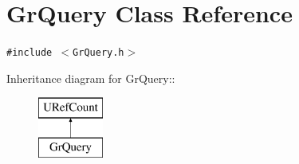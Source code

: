 \hypertarget{class_gr_query}{
\section{GrQuery Class Reference}
\label{class_gr_query}
}
{\tt \#include $<$GrQuery.h$>$}

Inheritance diagram for GrQuery::\begin{figure}[H]
\begin{center}
\leavevmode
\includegraphics[height=2cm]{class_gr_query}
\end{center}
\end{figure}

